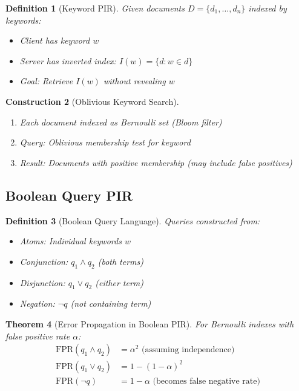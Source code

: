 \documentclass[11pt,final,hidelinks]{article}
\newtheorem{theorem}{Theorem}[section]
\newtheorem{definition}[theorem]{Definition}
\newtheorem{construction}[theorem]{Construction}
\begin{document}
\begin{definition}[Keyword PIR]
Given documents $D = \{d_1, \ldots, d_n\}$ indexed by keywords:
\begin{itemize}
    \item Client has keyword $w$
    \item Server has inverted index: $I(w) = \{d : w \in d\}$
    \item Goal: Retrieve $I(w)$ without revealing $w$
\end{itemize}
\end{definition}

\begin{construction}[Oblivious Keyword Search]
\begin{enumerate}
    \item Each document indexed as Bernoulli set (Bloom filter)
    \item Query: Oblivious membership test for keyword
    \item Result: Documents with positive membership (may include false positives)
\end{enumerate}
\end{construction}

\subsection{Boolean Query PIR}

\begin{definition}[Boolean Query Language]
Queries constructed from:
\begin{itemize}
    \item Atoms: Individual keywords $w$
    \item Conjunction: $q_1 \land q_2$ (both terms)
    \item Disjunction: $q_1 \lor q_2$ (either term)
    \item Negation: $\neg q$ (not containing term)
\end{itemize}
\end{definition}

\begin{theorem}[Error Propagation in Boolean PIR]
For Bernoulli indexes with false positive rate $\alpha$:
\begin{align}
\text{FPR}(q_1 \land q_2) &= \alpha^2 \text{ (assuming independence)}\\
\text{FPR}(q_1 \lor q_2) &= 1 - (1-\alpha)^2\\
\text{FPR}(\neg q) &= 1 - \alpha \text{ (becomes false negative rate)}
\end{align}
\end{theorem}
\end{document}
